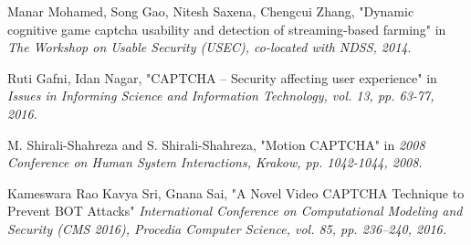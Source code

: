 \begin{thebibliography}{9}
 Manar Mohamed, Song Gao, Nitesh Saxena, Chengcui Zhang,  "Dynamic cognitive  game  captcha  usability  and  detection  of  streaming-based  farming" in \emph{The Workshop on Usable Security (USEC), co-located with NDSS, 2014}.

 Ruti Gafni, Idan Nagar, "CAPTCHA – Security affecting user experience" in \emph{Issues in Informing Science and Information Technology, vol. 13, pp. 63-77, 2016.}

 M. Shirali-Shahreza and S. Shirali-Shahreza, "Motion CAPTCHA" in \emph{2008 Conference on Human System Interactions, Krakow, pp. 1042-1044, 2008}.

 Kameswara Rao Kavya Sri, Gnana Sai, "A Novel Video CAPTCHA Technique to Prevent BOT Attacks" \emph{International Conference on Computational Modeling and  Security (CMS 2016), Procedia Computer  Science, vol. 85, pp. 236–240, 2016.}

\end{thebibliography}